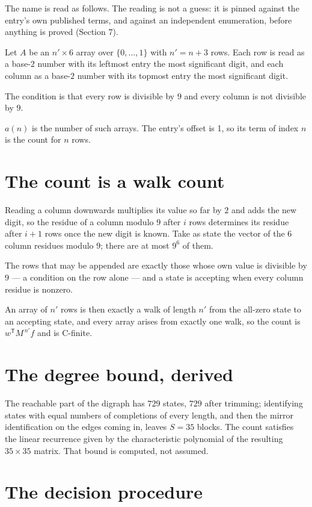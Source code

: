 \documentclass[11pt]{article}
\theoremstyle{definition}
\begin{document}
The name is read as follows. The reading is not a guess: it is pinned against the entry's own published terms, and against an independent enumeration, before anything is proved (Section 7).

Let $A$ be an $n' \times 6$ array over $\{0,\dots,1\}$ with $n' = n + 3$ rows. Each row is read as a base-$2$ number with its leftmost entry the most significant digit, and each column as a base-$2$ number with its topmost entry the most significant digit.

The condition is that every row is divisible by $9$ and every column is not divisible by $9$.

$a(n)$ is the number of such arrays. The entry's offset is 1, so its term of index $n$ is the count for $n$ rows.

\section{The count is a walk count}

Reading a column downwards multiplies its value so far by $2$ and adds the new digit, so the residue of a column modulo $9$ after $i$ rows determines its residue after $i+1$ rows once the new digit is known. Take as state the vector of the $6$ column residues modulo $9$; there are at most $9^{6}$ of them.

The rows that may be appended are exactly those whose own value is divisible by $9$ --- a condition on the row alone --- and a state is accepting when every column residue is nonzero.

An array of $n'$ rows is then exactly a walk of length $n'$ from the all-zero state to an accepting state, and every array arises from exactly one walk, so the count is $w^{\mathsf T}M^{\,n'}f$ and is C-finite.

\section{The degree bound, derived}

The reachable part of the digraph has $729$ states, $729$ after trimming; identifying states with equal numbers of completions of every length, and then the mirror identification on the edges coming in, leaves $S = 35$ blocks. The count satisfies the linear recurrence given by the characteristic polynomial of the resulting $35\times35$ matrix. That bound is computed, not assumed.

\section{The decision procedure}
\end{document}
